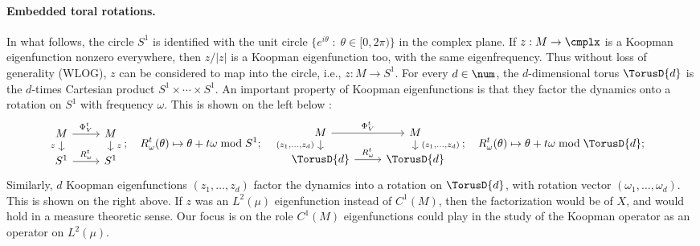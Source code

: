 \documentclass[12pt,oneside]{article}
\begin{document}
\paragraph{Embedded toral rotations.} In what follows, the circle $S^1$ is identified with the unit circle $\{ e^{i\theta} \; : \; \theta\in [0,2\pi)\}$ in the complex plane. If $z:M\to\cmplx$ is a Koopman eigenfunction nonzero everywhere, then $z/|z|$ is a Koopman eigenfunction too, with the same eigenfrequency. Thus without loss of generality (WLOG), $z$ can be considered to map into the circle, i.e., $z:M\to S^1$. For every $d\in\num$, the $d$-dimensional torus $\TorusD{d}$ is the $d$-times Cartesian product  $S^1 \times \cdots \times S^1$. An important property of Koopman eigenfunctions is that they factor the dynamics onto a rotation on $S^1$ with frequency $\omega$. This is shown on the left below : 
%
\begin{equation}\label{eqn:pi_factor}
	\begin{tikzcd}[row sep = small]
		M \arrow[swap]{d}{z\ } \arrow{r}{\Phi^t_V} &M \arrow{d}{\ z} \\
		S^1 \arrow{r}{R_\omega^t} &S^1
	\end{tikzcd}; \quad
	R_\omega^t(\theta) \mapsto \theta+t\omega \bmod S^1; \quad
	\begin{tikzcd}[row sep = small]
		M \arrow[swap]{d}{(z_1,\ldots,z_d)\ } \arrow{r}{\Phi^t_V} &M \arrow{d}{\ (z_1,\ldots,z_d)} \\
		\TorusD{d} \arrow{r}{R_\omega^t} &\TorusD{d}
	\end{tikzcd}; \quad
	R_\omega^t(\theta) \mapsto \theta+t\omega \bmod \TorusD{d}; \quad
\end{equation}
%
Similarly, $d$ Koopman eigenfunctions $(z_1,\ldots,z_d)$ factor the dynamics into a rotation on $\TorusD{d}$, with rotation vector $\left( \omega_1,\ldots,\omega_d \right)$. This is shown on the right above. If $z$ was an $L^2(\mu)$ eigenfunction instead of $C^1(M)$, then the factorization would be of $X$, and would hold in a measure theoretic sense. Our focus is on the role $C^1(M)$ eigenfunctions could play in the study of the Koopman operator as an operator on $L^2(\mu)$.
\end{document}
